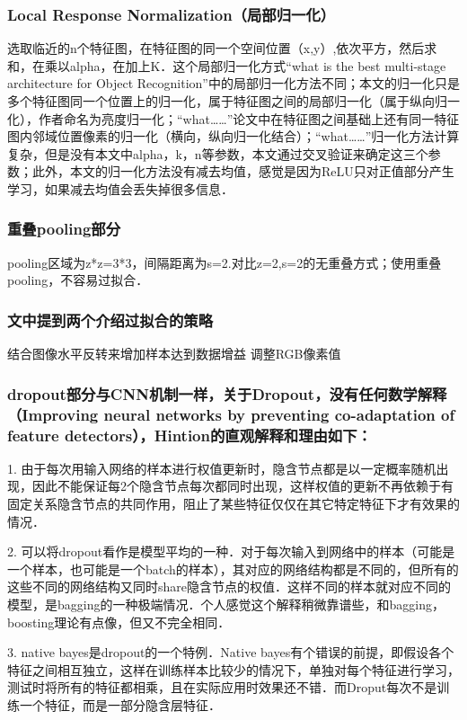\subsubsection{Local Response Normalization（局部归一化）}
选取临近的n个特征图，在特征图的同一个空间位置（x,y）,依次平方，然后求和，在乘以alpha，在加上K．这个局部归一化方式“what is the best multi-stage architecture for Object Recognition”中的局部归一化方法不同；本文的归一化只是多个特征图同一个位置上的归一化，属于特征图之间的局部归一化（属于纵向归一化），作者命名为亮度归一化；“what……”论文中在特征图之间基础上还有同一特征图内邻域位置像素的归一化（横向，纵向归一化结合）；“what……”归一化方法计算复杂，但是没有本文中alpha，k，n等参数，本文通过交叉验证来确定这三个参数；此外，本文的归一化方法没有减去均值，感觉是因为ReLU只对正值部分产生学习，如果减去均值会丢失掉很多信息．
\subsubsection{重叠pooling部分}
pooling区域为z*z=3*3，间隔距离为s=2.对比z=2,s=2的无重叠方式；使用重叠pooling，不容易过拟合．
\subsubsection{文中提到两个介绍过拟合的策略}
结合图像水平反转来增加样本达到数据增益
调整RGB像素值
\subsubsection{dropout部分与CNN机制一样，关于Dropout，没有任何数学解释（Improving neural networks by preventing co-adaptation of feature detectors），Hintion的直观解释和理由如下：}
1. 由于每次用输入网络的样本进行权值更新时，隐含节点都是以一定概率随机出现，因此不能保证每2个隐含节点每次都同时出现，这样权值的更新不再依赖于有固定关系隐含节点的共同作用，阻止了某些特征仅仅在其它特定特征下才有效果的情况．

2. 可以将dropout看作是模型平均的一种．对于每次输入到网络中的样本（可能是一个样本，也可能是一个batch的样本），其对应的网络结构都是不同的，但所有的这些不同的网络结构又同时share隐含节点的权值．这样不同的样本就对应不同的模型，是bagging的一种极端情况．个人感觉这个解释稍微靠谱些，和bagging，boosting理论有点像，但又不完全相同．

3. native bayes是dropout的一个特例．Native bayes有个错误的前提，即假设各个特征之间相互独立，这样在训练样本比较少的情况下，单独对每个特征进行学习，测试时将所有的特征都相乘，且在实际应用时效果还不错．而Droput每次不是训练一个特征，而是一部分隐含层特征．

